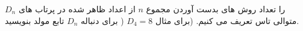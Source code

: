 \exercise
$D_n$
را تعداد روش های بدست آوردن مجموع
$n$
از اعداد ظاهر شده در پرتاب های متوالی تاس تعریف می کنیم. (برای مثال
$D_4 = 8$
(
برای دنباله
$D_n$
تابع مولد بنویسید.